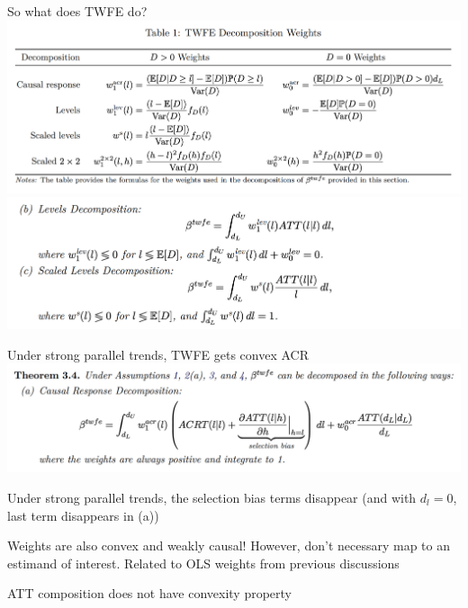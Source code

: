\documentclass[notes,11pt, aspectratio=169]{beamer}
\newenvironment{wideitemize}{\itemize\addtolength{\itemsep}{10pt}}{\enditemize}
\begin{document}
\begin{frame}{So what does TWFE do?}
  \includegraphics[width=0.8\linewidth]{images/twfe_continuous_did_weights.png}
  \includegraphics[width=0.8\linewidth]{images/twfe_continuous_did_formula2.png}
\end{frame}

\begin{frame}{Under strong parallel trends, TWFE gets convex ACR}
  \includegraphics[width=0.8\linewidth]{images/twfe_continuous_did_formula1.png}
  \begin{wideitemize}
    \item Under strong parallel trends, the selection bias terms disappear (and with $d_{l} = 0$, last term disappears in (a))
    \item Weights are also convex and weakly causal! However, don't necessary map to an estimand of interest. Related to OLS weights from previous discussions
    \item ATT composition does not have convexity property
  \end{wideitemize}
\end{frame}
\end{document}

